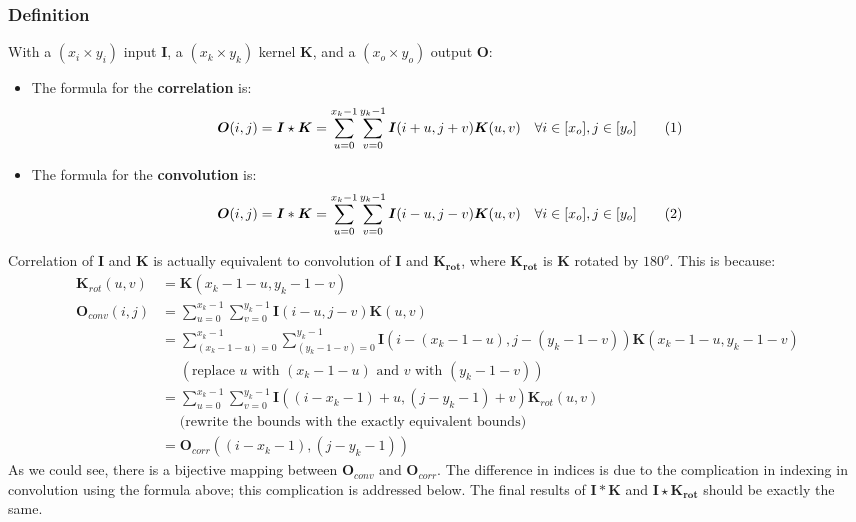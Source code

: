 \documentclass[12pt]{article}
\newcommand\numberthis{\stepcounter{equation}\tag{\theequation}}
\begin{document}
\subsubsection{Definition}
With a $(x_i \times y_i)$ input $\bm{I}$, a $(x_k \times y_k)$ kernel $\bm{K}$, and a $(x_o \times y_o)$ output $\bm{O}$:
\begin{itemize}
    \item The formula for the \textbf{correlation} is:
    \begin{align*}
        \bm{O}(i, j) = \bm{I} \star \bm{K} = \sum_{u = 0}^{x_k - 1}\sum_{v = 0}^{y_k - 1} \bm{I}(i + u, j + v)\bm{K}(u, v) \quad \forall i \in [x_o], j \in [y_o]
        \numberthis \label{correlation}
    \end{align*}
    \item The formula for the \textbf{convolution} is:
    \begin{align*}
        \bm{O}(i, j) = \bm{I} \ast \bm{K} = \sum_{u = 0}^{x_k - 1}\sum_{v = 0}^{y_k - 1} \bm{I}(i - u, j - v)\bm{K}(u, v) \quad \forall i \in [x_o], j \in [y_o]
        \numberthis \label{convolution}
    \end{align*}  
\end{itemize}
Correlation of $\bm{I}$ and $\bm{K}$ is actually equivalent to convolution of $\bm{I}$ and $\bm{K_{rot}}$, where $\bm{K_{rot}}$ is $\bm{K}$ rotated by $180^o$. This is because:
\begin{align*}
    \bm{K}_{rot}(u, v) &= \bm{K}(x_k - 1 - u, y_k - 1 - v)\\
    \bm{O}_{conv}(i, j) &= \sum_{u = 0}^{x_k - 1}\sum_{v = 0}^{y_k - 1} \bm{I}(i - u, j - v)\bm{K}(u, v)\\
    &= \sum_{(x_k - 1 - u) = 0}^{x_k - 1}\sum_{(y_k - 1 - v) = 0}^{y_k - 1} \bm{I}(i - (x_k - 1 - u), j - (y_k - 1 - v))\bm{K}(x_k - 1 - u, y_k - 1 - v)\\
    &\quad\,\, (\text{replace } u \text{ with } (x_k - 1 - u) \text{ and } v \text{ with } (y_k - 1 - v))\\
    &= \sum_{u = 0}^{x_k - 1}\sum_{v = 0}^{y_k - 1} \bm{I}((i - x_k - 1)+ u , (j - y_k - 1) + v)\bm{K}_{rot}(u, v)\\
    &\quad\,\, \text{(rewrite the bounds with the exactly equivalent bounds)}\\
    &= \bm{O}_{corr}((i - x_k - 1), (j - y_k - 1))
\end{align*}
As we could see, there is a bijective mapping between $\bm{O}_{conv}$ and $\bm{O}_{corr}$. The difference in indices is due to the complication in indexing in convolution using the formula above; this complication is addressed below. The final results of $\bm{I} \ast \bm{K}$ and $\bm{I} \star \bm{K_{rot}}$ should be exactly the same.
\end{document}
